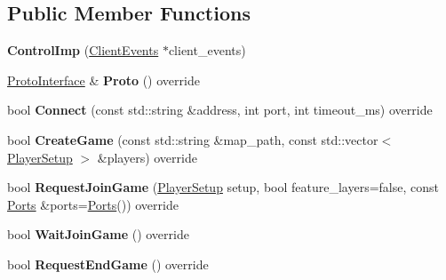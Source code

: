 \subsection*{Public Member Functions}
\begin{DoxyCompactItemize}
\item 
\mbox{\label{classsc2_1_1_control_imp_a163b08085af169a3abf4b0e7ba4e748a}} 
{\bfseries Control\+Imp} (\hyperlink{classsc2_1_1_client_events}{Client\+Events} $\ast$client\+\_\+events)
\item 
\mbox{\label{classsc2_1_1_control_imp_a99f5294c1640000270d0549c45f496e5}} 
\hyperlink{classsc2_1_1_proto_interface}{Proto\+Interface} \& {\bfseries Proto} () override
\item 
\mbox{\label{classsc2_1_1_control_imp_a77cf6f8b49f36d5166ae1682e531984a}} 
bool {\bfseries Connect} (const std\+::string \&address, int port, int timeout\+\_\+ms) override
\item 
\mbox{\label{classsc2_1_1_control_imp_a3c7df31166928ec15984637cb3d02f62}} 
bool {\bfseries Create\+Game} (const std\+::string \&map\+\_\+path, const std\+::vector$<$ \hyperlink{structsc2_1_1_player_setup}{Player\+Setup} $>$ \&players) override
\item 
\mbox{\label{classsc2_1_1_control_imp_aeb095b05e1c68cfd70bd83c104261a28}} 
bool {\bfseries Request\+Join\+Game} (\hyperlink{structsc2_1_1_player_setup}{Player\+Setup} setup, bool feature\+\_\+layers=false, const \hyperlink{structsc2_1_1_ports}{Ports} \&ports=\hyperlink{structsc2_1_1_ports}{Ports}()) override
\item 
\mbox{\label{classsc2_1_1_control_imp_a62473ca49425616c9d7eb2c315a41990}} 
bool {\bfseries Wait\+Join\+Game} () override
\item 
\mbox{\label{classsc2_1_1_control_imp_a1b2023cfb1d0c140fc4c73ba09a583d4}} 
bool {\bfseries Request\+End\+Game} () override
\item 
\mbox{\label{classsc2_1_1_control_imp_afaa3411055b28596d61ecc134cc1076f}} 

\end{DoxyCompactItemize}
